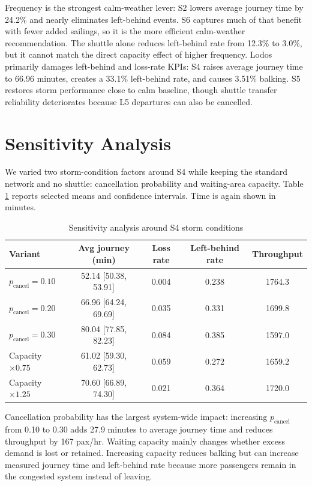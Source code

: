 \documentclass[11pt,a4paper]{article}
\begin{document}
Frequency is the strongest calm-weather lever: S2 lowers average journey time by 24.2\% and nearly eliminates left-behind events. S6 captures much of that benefit with fewer added sailings, so it is the more efficient calm-weather recommendation. The shuttle alone reduces left-behind rate from 12.3\% to 3.0\%, but it cannot match the direct capacity effect of higher frequency. Lodos primarily damages left-behind and loss-rate KPIs: S4 raises average journey time to 66.96 minutes, creates a 33.1\% left-behind rate, and causes 3.51\% balking. S5 restores storm performance close to calm baseline, though shuttle transfer reliability deteriorates because L5 departures can also be cancelled.

\section{Sensitivity Analysis}
We varied two storm-condition factors around S4 while keeping the standard network and no shuttle: cancellation probability and waiting-area capacity. Table \ref{tab:sensitivity} reports selected means and confidence intervals. Time is again shown in minutes.

\begin{table}[H]
\centering
\caption{Sensitivity analysis around S4 storm conditions}
\label{tab:sensitivity}
\begin{tabular}{lcccc}
\toprule
\textbf{Variant} & \textbf{Avg journey (min)} & \textbf{Loss rate} & \textbf{Left-behind rate} & \textbf{Throughput} \\
\midrule
$p_{\text{cancel}}=0.10$ & 52.14 [50.38, 53.91] & 0.004 & 0.238 & 1764.3 \\
$p_{\text{cancel}}=0.20$ & 66.96 [64.24, 69.69] & 0.035 & 0.331 & 1699.8 \\
$p_{\text{cancel}}=0.30$ & 80.04 [77.85, 82.23] & 0.084 & 0.385 & 1597.0 \\
Capacity $\times 0.75$ & 61.02 [59.30, 62.73] & 0.059 & 0.272 & 1659.2 \\
Capacity $\times 1.25$ & 70.60 [66.89, 74.30] & 0.021 & 0.364 & 1720.0 \\
\bottomrule
\end{tabular}
\end{table}

Cancellation probability has the largest system-wide impact: increasing $p_{\text{cancel}}$ from 0.10 to 0.30 adds 27.9 minutes to average journey time and reduces throughput by 167 pax/hr. Waiting capacity mainly changes whether excess demand is lost or retained. Increasing capacity reduces balking but can increase measured journey time and left-behind rate because more passengers remain in the congested system instead of leaving.
\end{document}
